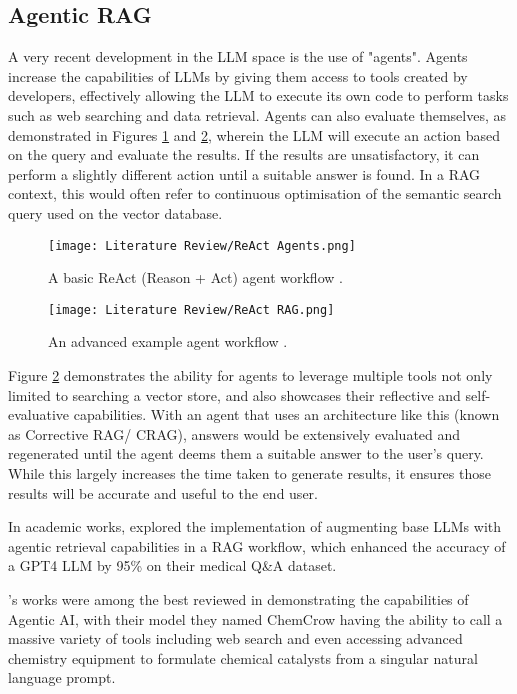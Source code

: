 \subsection{Agentic RAG}
A very recent development in the LLM space is the use of "agents". Agents increase the capabilities of LLMs by giving them 
access to tools created by developers, effectively allowing the LLM to execute its own code to perform tasks such as web searching 
and data retrieval. Agents can also evaluate themselves, as demonstrated in Figures \ref{fig:ReActAgents} and \ref{fig:ReActRAG}, 
wherein the LLM will execute an action based on the query and evaluate the results. If the results are unsatisfactory, it can perform a slightly 
different action until a suitable answer is found. In a RAG context, this would often refer to continuous optimisation of the semantic search query 
used on the vector database.

\begin{figure}[H] 
    \centering
    \texttt{[image: Literature Review/ReAct Agents.png]}
    \caption{A basic ReAct (Reason + Act) agent workflow \autocite{weaviateWhatAgenticRAG2024}.}
    \label{fig:ReActAgents}
\end{figure}

\begin{figure}[H] 
    \centering
    \texttt{[image: Literature Review/ReAct RAG.png]}
    \caption{An advanced example agent workflow \autocite{weaviateWhatAgenticRAG2024}.}
    \label{fig:ReActRAG}
\end{figure}

Figure \ref{fig:ReActRAG} demonstrates the ability for agents to leverage multiple tools not only limited to searching a vector store,
and also showcases their reflective and self-evaluative capabilities. With an agent that uses an architecture like this (known as Corrective RAG/
CRAG), answers would be extensively evaluated and regenerated until the agent deems them a suitable answer to the user's query. While this largely increases the time taken to generate results, it ensures those results will be accurate and useful to the end user. 

In academic works, \textcite{wooCustomLargeLanguage2025} explored the implementation of augmenting base LLMs with agentic retrieval 
capabilities in a RAG workflow, which enhanced the accuracy of a GPT4 LLM by 95\% on their medical Q\&A dataset.

\textcite{m.branAugmentingLargeLanguage2024}'s works were among the best reviewed in demonstrating the capabilities of 
Agentic AI, with their model they named ChemCrow having the ability to call a massive variety of tools including web search 
and even accessing advanced chemistry equipment to formulate chemical catalysts from a singular natural language prompt.

